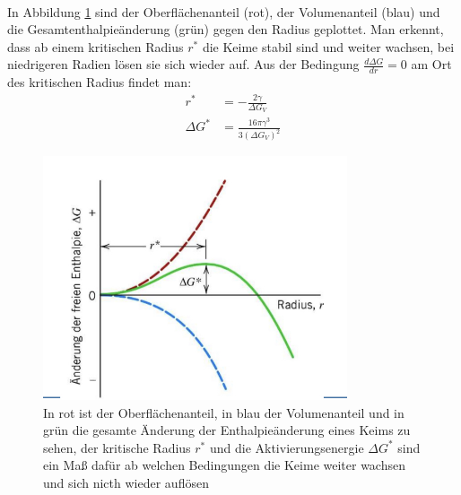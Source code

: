 \documentclass[11pt,a4paper]{article}
\numberwithin{equation}{section}
\numberwithin{figure}{section}
\begin{document}
\\
\begin{addmargin}[25pt]{0pt}
In Abbildung \ref{fig:Enthalpie_Phasenumwandlung} sind der Oberflächenanteil (rot), der Volumenanteil (blau) und die Gesamtenthalpieänderung (grün) gegen den Radius geplottet. Man erkennt, dass ab einem kritischen Radius $r^*$ die Keime stabil sind und weiter wachsen, bei niedrigeren Radien lösen sie sich wieder auf. Aus der Bedingung $\frac{\si{d} \Delta G}{\si{d}r} = 0$ am Ort des kritischen Radius findet man:
\begin{align}\label{eq:kritischer_Radius}
    r^* &=-\frac{2\gamma}{\Delta G_V}\\\label{eq:Aktivierungsenergie}
    \Delta G^* &= \frac{16\pi\gamma^3}{3(\Delta G_V)^2}
\end{align}
\begin{figure}[h]
    \centering
    \includegraphics[width = 0.8\textwidth]{images/Materialwissenschaften/Enthalpie_Phasneumwandlung.jpeg}
    \caption{In rot ist der Oberflächenanteil, in blau der Volumenanteil und in grün die gesamte Änderung der Enthalpieänderung eines Keims zu sehen, der kritische Radius $r^*$ und die Aktivierungsenergie $\Delta G^*$ sind ein Maß dafür ab welchen Bedingungen die Keime weiter wachsen und sich nicth wieder auflösen}
    \label{fig:Enthalpie_Phasenumwandlung}
\end{figure}
\end{addmargin}
\end{document}
